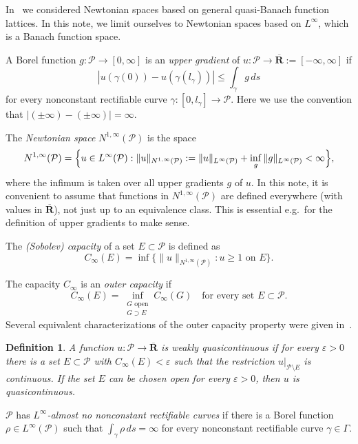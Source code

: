 \documentclass[a4paper,twoside]{article}
\theoremstyle{propositional}
\theoremstyle{descriptive}
\newtheorem{deff}[thm]{Definition}
\newcommand{\Cinfty}{{C_\infty}}
\newcommand*{\coloneq}{:=}
\newcommand{\eps}{\varepsilon}
\newcommand{\R}{\mathbf{R}}
\newcommand{\eR}{{\overline{\R}}}
\newcommand{\Ninfty}{N^{1,\infty}}
\newcommand{\NinftyP}{N^{1,\infty}(\P)}
\newcommand{\Ga}{\Gamma}
\renewcommand{\P}{\mathcal{P}}
\numberwithin{equation}{section}
\begin{document}
In~\cite{BBLMaly} we considered Newtonian spaces based
on general quasi-Banach function lattices.
In this note, we limit ourselves to Newtonian spaces 
based on   
$L^\infty$, which is a Banach function space.


A Borel function $g: \P \to [0,\infty]$ 
is an \emph{upper gradient} of $u: \P \to \eR:=[-\infty,\infty]$ if
\begin{equation*} %
 |u(\gamma(0)) - u(\gamma(l_\gamma))| \le \int_\gamma g\,ds
\end{equation*}
for every nonconstant rectifiable curve $\gamma: [0, l_\gamma]\to\P$. 
Here  we  use the convention that
$|(\pm\infty)-(\pm\infty)|=\infty$. 



The \emph{Newtonian space} $\NinftyP$ is the space
\begin{equation*}  %
  \Ninfty(\P)  =  \Bigl\{u\in L^\infty(\P) :
  \|u\|_{\NinftyP}\coloneq \| u \|_{L^\infty(\P)} + \inf_g \|g\|_{L^\infty(\P)} <\infty \Bigr\},
\end{equation*}
where the infimum is taken over all upper gradients $g$ of $u$.
In this note, it is convenient to
assume that functions in $\NinftyP$
 are defined everywhere (with values in $\eR$),
not just up to an equivalence class.
This is essential e.g.\  for the definition of
upper gradients to make sense.


The \emph{\textup{(}Sobolev\/\textup{)} capacity} of a set
$E\subset \P$ is defined as
\[
\Cinfty(E) = \inf\{ \|u\|_{\NinftyP}: u\ge 1 \mbox{ on }E\}.
\]


The capacity $\Cinfty$ is  an \emph{outer capacity} if
\[
    \Cinfty(E) = \inf_{\substack{G\text{ open} \\G \supset E  }} \Cinfty(G)  
    \quad \text{for every set } E \subset \P.
\]
Several equivalent characterizations
of the outer capacity property were given in~\cite[Theorem~1.4]{BBLMaly}.



\begin{deff}
A function $u: \P \to \eR$ is \emph{weakly quasicontinuous}
if for every $\eps>0$ there is a set $E \subset \P$ with
$\Cinfty(E) < \eps$ such that the restriction $u\vert_{\P \setminus E}$ is
continuous.
If the set
$E$ can be chosen open for every $\eps>0$, then $u$ is
\emph{quasicontinuous}.
\end{deff}

$\P$ has \emph{$L^\infty$-almost no nonconstant rectifiable curves} 
if there is a Borel function $\rho \in L^\infty(\P)$
 such that $\int_\gamma \rho\,ds = \infty$ for every 
nonconstant rectifiable curve $\gamma \in \Ga$.
\end{document}

